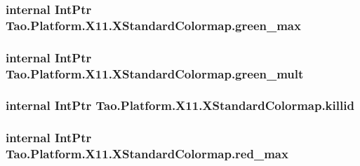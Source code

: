 \label{struct_tao_1_1_platform_1_1_x11_1_1_x_standard_colormap_ab49dd3711c62dfb1506e938f108a6aa4}
\hypertarget{struct_tao_1_1_platform_1_1_x11_1_1_x_standard_colormap_a9e37698d0d58b69e9b2aee7cf1661b05}{
\subsubsection[{green\_\-max}]{\setlength{\rightskip}{0pt plus 5cm}internal IntPtr {\bf Tao.Platform.X11.XStandardColormap.green\_\-max}}}
\label{struct_tao_1_1_platform_1_1_x11_1_1_x_standard_colormap_a9e37698d0d58b69e9b2aee7cf1661b05}
\hypertarget{struct_tao_1_1_platform_1_1_x11_1_1_x_standard_colormap_a9d86617d7345be997933758a36870270}{
\subsubsection[{green\_\-mult}]{\setlength{\rightskip}{0pt plus 5cm}internal IntPtr {\bf Tao.Platform.X11.XStandardColormap.green\_\-mult}}}
\label{struct_tao_1_1_platform_1_1_x11_1_1_x_standard_colormap_a9d86617d7345be997933758a36870270}
\hypertarget{struct_tao_1_1_platform_1_1_x11_1_1_x_standard_colormap_ab85578e0af13c4c7e690e9e8711ee85d}{
\subsubsection[{killid}]{\setlength{\rightskip}{0pt plus 5cm}internal IntPtr {\bf Tao.Platform.X11.XStandardColormap.killid}}}
\label{struct_tao_1_1_platform_1_1_x11_1_1_x_standard_colormap_ab85578e0af13c4c7e690e9e8711ee85d}
\hypertarget{struct_tao_1_1_platform_1_1_x11_1_1_x_standard_colormap_ae1f7beda08f461493902b17293468932}{
\subsubsection[{red\_\-max}]{\setlength{\rightskip}{0pt plus 5cm}internal IntPtr {\bf Tao.Platform.X11.XStandardColormap.red\_\-max}}}
